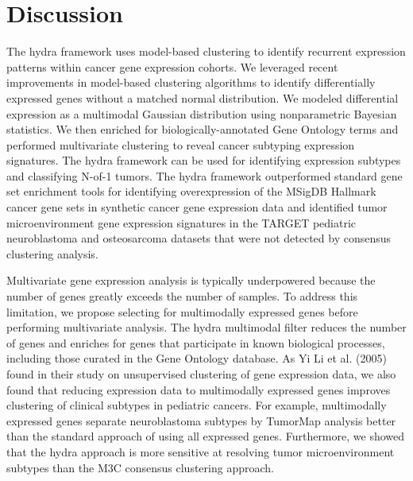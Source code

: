 \documentclass[10pt,letterpaper]{article}
\begin{document}
\section*{Discussion}
The hydra framework uses model-based clustering to identify recurrent expression patterns within cancer gene expression cohorts. We leveraged recent improvements in model-based clustering algorithms to identify differentially expressed genes without a matched normal distribution. We modeled differential expression as a multimodal Gaussian distribution using nonparametric Bayesian statistics. We then enriched for biologically-annotated Gene Ontology terms and performed multivariate clustering to reveal cancer subtyping expression signatures. The hydra framework can be used for identifying expression subtypes and classifying N-of-1 tumors. The hydra framework outperformed standard gene set enrichment tools for identifying overexpression of the MSigDB Hallmark cancer gene sets in synthetic cancer gene expression data and identified tumor microenvironment gene expression signatures in the TARGET pediatric neuroblastoma and osteosarcoma datasets that were not detected by consensus clustering analysis. 

Multivariate gene expression analysis is typically underpowered because the number of genes greatly exceeds the number of samples. To address this limitation, we propose selecting for multimodally expressed genes before performing multivariate analysis. The hydra multimodal filter reduces the number of genes and enriches for genes that participate in known biological processes, including those curated in the Gene Ontology database. As Yi Li et al. (2005) found in their study on unsupervised clustering of gene expression data, we also found that reducing expression data to multimodally expressed genes improves clustering of clinical subtypes in pediatric cancers. For example, multimodally expressed genes separate neuroblastoma subtypes by TumorMap analysis better than the standard approach of using all expressed genes. Furthermore, we showed that the hydra approach is more sensitive at resolving tumor microenvironment subtypes than the M3C consensus clustering approach.
\end{document}
